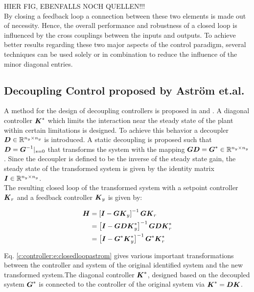 HIER FIG, EBENFALLS NOCH QUELLEN!!!\\

By closing a feedback loop a connection between these two elements is made out of necessity. Hence, the overall performance and robustness of a closed loop is influenced by the cross couplings between the inputs and outputs. To achieve better results regarding these two major aspects of the control paradigm, several techniques can be used solely or in combination to reduce the influence of the minor diagonal entries.\\


\subsection{Decoupling Control proposed by Astr\"om et.al.}
\label{c:controller:sub:astrom}

A method for the design of decoupling controllers is proposed in \cite{Astrom2001a} and \cite{Astrom2006}. A diagonal controller $\mbox{\boldmath$K$}^*$ which limits the interaction near the steady state of the plant within certain limitations is designed. To achieve this behavior a decoupler $\mbox{\boldmath$D$} \in  \mathbb{R}^{n_y \times n_y}$ is introduced. A static decoupling is proposed such that $\mbox{\boldmath$D$} = \mbox{\boldmath$G$}^{-1}|_{s=0}$ that transforms the system with the mapping $\mbox{\boldmath$G$} \mbox{\boldmath$D$} = \mbox{\boldmath$G$}^* \in \mathbb{R}^{n_y \times n_y}$. Since the decoupler is defined to be the inverse of the steady state gain, the steady state of the transformed system is given by the identity matrix $\mbox{\boldmath$I$} \in \mathbb{R}^{n_y \times n_y}$.\\ 

The resulting closed loop of the transformed system with a setpoint controller $\mbox{\boldmath$K$}_r$ and a feedback controller $\mbox{\boldmath$K$}_y$ is given by: 

\begin{align}
\begin{split}
\mbox{\boldmath$H$} &=  \left[ \mbox{\boldmath$I$}  - \mbox{\boldmath$G$} \mbox{\boldmath$K$}_y \right]^{-1} \mbox{\boldmath$G$} \mbox{\boldmath$K$}_r \\
&= \left[ \mbox{\boldmath$I$}  - \mbox{\boldmath$G$} \mbox{\boldmath$D$} \mbox{\boldmath$K$}_y^* \right]^{-1} \mbox{\boldmath$G$} \mbox{\boldmath$D$} \mbox{\boldmath$K$}_r^* \\
	 &= \left[ \mbox{\boldmath$I$}  - \mbox{\boldmath$G$}^* \mbox{\boldmath$K$}_y^* \right]^{-1} \mbox{\boldmath$G$}^* \mbox{\boldmath$K$}_r^*
\end{split}
\label{c:controller:e:closedloopastrom}
\end{align}

Eq. \ref{c:controller:e:closedloopastrom} gives various important transformations between the controller and system of the original identified system and the new transformed system.The diagonal controller $\mbox{\boldmath$K$}^*$, designed based on the decoupled system $\mbox{\boldmath$G$}^*$ is connected to the controller of the original system via $\mbox{\boldmath$K$}^* = \mbox{\boldmath$D$} \mbox{\boldmath$K$}$.\\ 

